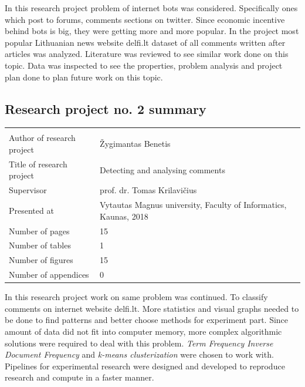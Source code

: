 \documentclass[a4paper,12pt]{article}
\begin{document}
	In this research project problem of internet bots was considered. Specifically ones which post to forums, comments sections on twitter. Since economic incentive behind bots is big, they were getting more and more popular. In the project most popular Lithuanian news website delfi.lt dataset of all comments written after articles was analyzed. Literature was reviewed to see similar work done on this topic. Data was inspected to see the properties, problem analysis and project plan done to plan future work on this topic. 
	
	\clearpage
	
	\subsection{Research project no. 2 summary}
	
	
	\noindent
	\begin{center}
		\begin{tabular}{L{4.5cm} L{8cm}}
			\\ 
			Author of research project & Žygimantas Benetis \\
			Title of research project & Detecting and analysing comments\\
			Supervisor & prof. dr. Tomas Krilavičius\\
			Presented at & Vytautas Magnus university, Faculty of Informatics, Kaunas, 2018\\
			Number of pages & 15\\
			Number of tables & 1\\
			Number of figures & 15\\
			Number of appendices & 0\\
		\end{tabular}
	\end{center} 
	
	In this research project work on same problem was continued. To classify comments on internet website delfi.lt. More statistics  and visual graphs needed to be done to find patterns and better choose methods for experiment part. Since amount of data did not fit into computer memory, more complex algorithmic solutions were required to deal with this problem. \textit{Term Frequency Inverse Document Frequency} and \textit{k-means clusterization} were chosen to work with. Pipelines for experimental research were designed and developed to reproduce research and compute in a faster manner.
	
	\clearpage
    
\end{document}
